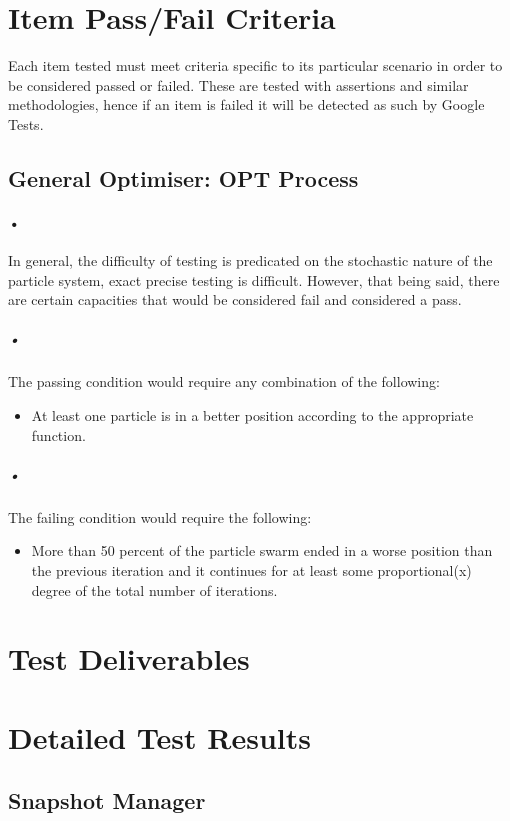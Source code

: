 \documentclass[11pt]{article}
\begin{document}
\section{Item Pass/Fail Criteria}
Each item tested must meet criteria specific to its particular scenario in order to be considered passed or failed. These are tested with assertions and similar methodologies, hence if an item is failed it will be detected as such by Google Tests.

\subsection{General Optimiser: OPT Process}
\paragraph{•}
In general, the difficulty of testing is predicated on the stochastic nature of the particle system, exact precise testing is difficult. However, that being said, there are certain capacities that would be considered fail and considered a pass. 

\subparagraph{•}
The passing condition would require any combination of the following:
\begin{itemize}
\item At least one particle is in a better position according to the appropriate function.
\end{itemize}

\subparagraph{•}
The failing condition would require the following: 
\begin{itemize}
\item More than 50 percent of the particle swarm ended in a worse position than the previous iteration and it continues for at least some proportional(x) degree of the total number of iterations.
\end{itemize}

\section{Test Deliverables}

\section{Detailed Test Results}
\subsection{Snapshot Manager}
\end{document}
